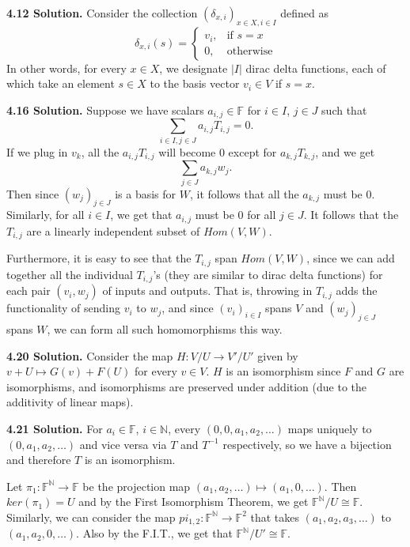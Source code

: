 \textbf{4.12 Solution.} Consider the collection $(\delta_{x,i})_{x \in X, i \in I}$ defined as
\[ \delta_{x,i}(s) =
\begin{cases}
    v_i, & \text{if } s = x \\
    0, & \text{otherwise}
\end{cases}
\]
In other words, for every $x \in X$, we designate $|I|$ dirac delta functions, each of which take an element $s \in X$ to the basis vector $v_i \in V$ if $s = x$.

\textbf{4.16 Solution.} Suppose we have scalars $a_{i,j} \in \mathbb{F}$ for $i \in I$, $j \in J$ such that
\[
\sum\limits_{i \in I, j \in J} a_{i, j}T_{i, j} = 0.
\]
If we plug in $v_k$, all the $a_{i, j}T_{i, j}$ will become 0 except for $a_{k, j}T_{k, j}$, and we get
\[
\sum\limits_{j \in J}a_{k, j}w_j.
\]
Then since $(w_j)_{j \in J}$ is a basis for $W$, it follows that all the $a_{k,j}$ must be 0. Similarly, for all $i \in I$, we get that $a_{i, j}$ must be 0 for all $j \in J$. It follows that the $T_{i, j}$ are a linearly independent subset of $Hom(V, W)$.

Furthermore, it is easy to see that the $T_{i, j}$ span $Hom(V, W)$, since we can add together all the individual $T_{i, j}$'s (they are similar to dirac delta functions) for each pair $(v_i, w_j)$ of inputs and outputs. That is, throwing in $T_{i, j}$ adds the functionality of sending $v_i$ to $w_j$, and since $(v_i)_{i \in I}$ spans $V$ and $(w_j)_{j \in J}$ spans $W$, we can form all such homomorphisms this way.

\textbf{4.20 Solution.} Consider the map $H: V/U \to V'/U'$ given by $v+U \mapsto G(v) + F(U)$ for every $v \in V$. $H$ is an isomorphism since $F$ and $G$ are isomorphisms, and isomorphisms are preserved under addition (due to the additivity of linear maps).

\textbf{4.21 Solution.} For $a_i \in \mathbb{F}$, $i \in \mathbb{N}$, every $(0, 0, a_1, a_2, \ldots)$ maps uniquely to $(0, a_1, a_2, \ldots)$ and vice versa via $T$ and $T^{-1}$ respectively, so we have a bijection and therefore $T$ is an isomorphism.

Let $\pi_1: \mathbb{F}^{\mathbb{N}} \to \mathbb{F}$ be the projection map $(a_1, a_2, \ldots) \mapsto (a_1, 0, \ldots)$. Then $ker(\pi_1) = U$ and by the First Isomorphism Theorem, we get $\mathbb{F}^{\mathbb{N}} / U \cong \mathbb{F}$. Similarly, we can consider the map $pi_{1, 2}: \mathbb{F}^{\mathbb{N}} \to \mathbb{F}^2$ that takes $(a_1, a_2, a_3, \ldots)$ to $(a_1, a_2, 0, \ldots)$. Also by the F.I.T., we get that $\mathbb{F}^{\mathbb{N}} / U' \cong \mathbb{F}$.

